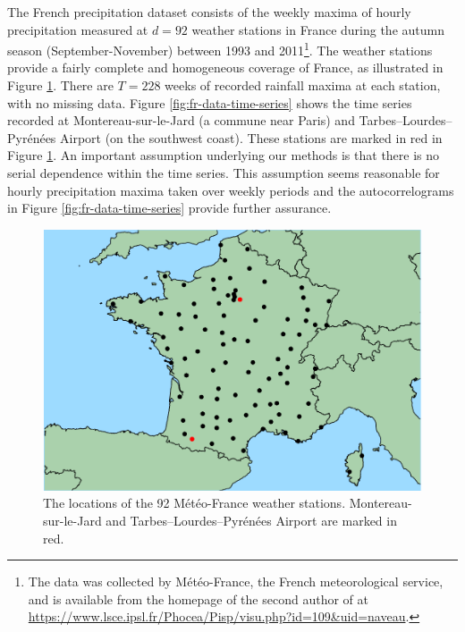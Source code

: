 \documentclass[en-GB, a4paper, nobind]{templates/bathreport}
\begin{document}
The French precipitation dataset consists of the weekly maxima of hourly precipitation measured at \(d=92\) weather stations in France during the autumn season (September-November) between 1993 and 2011\footnote{The data was collected by Météo-France, the French meteorological service, and is available from the homepage of the second author of \textcite{bernardClusteringMaximaSpatial2013} at \url{https://www.lsce.ipsl.fr/Phocea/Pisp/visu.php?id=109\&uid=naveau}.}. The weather stations provide a fairly complete and homogeneous coverage of France, as illustrated in Figure \ref{fig:fr-stations-map}. There are \(T=228\) weeks of recorded rainfall maxima at each station, with no missing data. Figure \ref{fig:fr-data-time-series} shows the time series recorded at Montereau-sur-le-Jard (a commune near Paris) and Tarbes--Lourdes--Pyrénées Airport (on the southwest coast). These stations are marked in red in Figure \ref{fig:fr-stations-map}. An important assumption underlying our methods is that there is no serial dependence within the time series. This assumption seems reasonable for hourly precipitation maxima taken over weekly periods and the autocorrelograms in Figure \ref{fig:fr-data-time-series} provide further assurance.

\begin{figure}

{\centering \includegraphics[width=0.65\linewidth]{figures/fr-stations-map-1} 

}

\caption[Map of Météo-France weather stations.]{The locations of the 92 Météo-France weather stations. Montereau-sur-le-Jard and Tarbes–Lourdes–Pyrénées Airport are marked in red.}\label{fig:fr-stations-map}
\end{figure}
\end{document}
